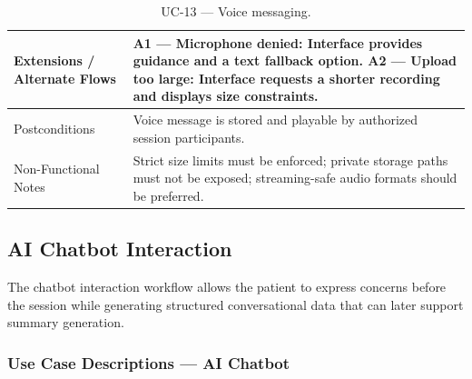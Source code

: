 \documentclass[a4paper,12pt]{report}
\begin{document}
\begin{table}[H]
\begin{tabularx}{\textwidth}{@{} L{0.28\textwidth} X @{}}
\midrule
Extensions / Alternate Flows &
A1 --- Microphone denied: Interface provides guidance and a text fallback option.
A2 --- Upload too large: Interface requests a shorter recording and displays size constraints. \\
\midrule
Postconditions & Voice message is stored and playable by authorized session participants. \\
\midrule
Non-Functional Notes & Strict size limits must be enforced; private storage paths must not be exposed; streaming-safe audio formats should be preferred. \\
\bottomrule
\end{tabularx}
\caption{UC-13 --- Voice messaging.}
\label{tab:uc13}
\end{table}

\subsection{AI Chatbot Interaction}
The chatbot interaction workflow allows the patient to express concerns before the session while generating structured conversational data that can later support summary generation.

\subsubsection*{Use Case Descriptions --- AI Chatbot}
\end{document}
